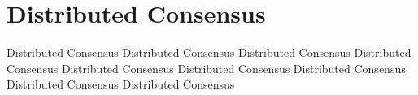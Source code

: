 \documentclass[dareport.tex]{subfiles}
\begin{document}
\section{Distributed Consensus} \label{sec:consensus}
Distributed Consensus Distributed Consensus
Distributed Consensus
Distributed Consensus
Distributed Consensus
Distributed Consensus
Distributed Consensus
Distributed Consensus
Distributed Consensus
\end{document}
